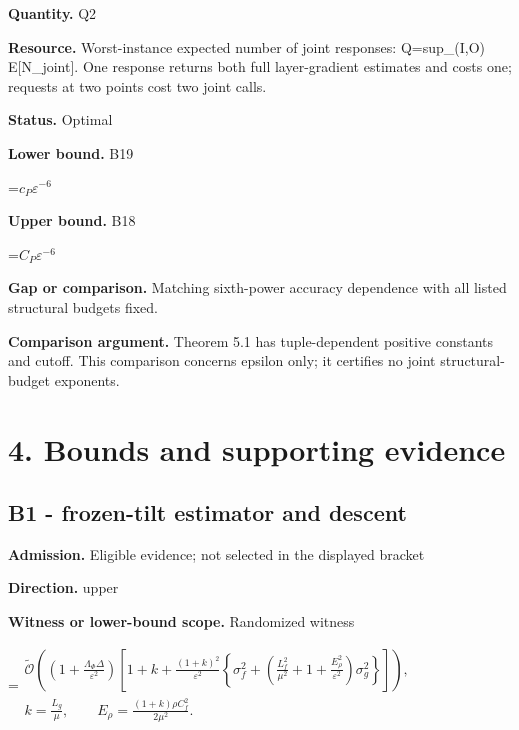 \documentclass[10pt,a4paper]{article}
\newcommand{\AtlasMath}[1]{\par\begingroup\centering\setbox0=\hbox{$\displaystyle #1$}\ifdim\wd0>1.4\linewidth\typeout{ATLAS WIDE FORMULA: \the\wd0}\fi\ifdim\wd0>\linewidth\resizebox{\linewidth}{!}{\box0}\else\box0\fi\par\endgroup}
\begin{document}
\textbf{Quantity.} Q2



\textbf{Resource.} Worst-instance expected number of joint responses: Q=sup\_(I,O) E[N\_joint]. One response returns both full layer-gradient estimates and costs one; requests at two points cost two joint calls.



\textbf{Status.} Optimal



\textbf{Lower bound.} B19



\AtlasMath{c_P\varepsilon^{-6}}


\textbf{Upper bound.} B18



\AtlasMath{C_P\varepsilon^{-6}}


\textbf{Gap or comparison.} Matching sixth-power accuracy dependence with all listed structural budgets fixed.



\textbf{Comparison argument.} Theorem 5.1 has tuple-dependent positive constants and cutoff. This comparison concerns epsilon only; it certifies no joint structural-budget exponents.



\section{4. Bounds and supporting evidence}


\subsection{B1 - frozen-tilt estimator and descent}


\textbf{Admission.} Eligible evidence; not selected in the displayed bracket



\textbf{Direction.} upper



\textbf{Witness or lower-bound scope.} Randomized witness



\AtlasMath{\begin{gathered}\widetilde{\mathcal{O}}\!\left(\left(1+\frac{\Lambda_\Phi\Delta}{\varepsilon^2}\right)\left[1+k+\frac{(1+k)^2}{\varepsilon^2}\left\{\sigma_f^2+\left(\frac{L_f^2}{\mu^2}+1+\frac{E_\rho^2}{\varepsilon^2}\right)\sigma_g^2\right\}\right]\right),\\k=\frac{L_g}{\mu},\qquad E_\rho=\frac{(1+k)\rho C_f^2}{2\mu^2}.\end{gathered}}
\end{document}
